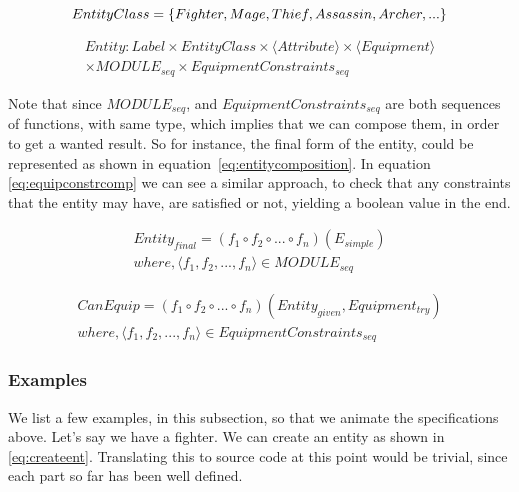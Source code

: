 \begin{equation}
  \label{eq:entityclass}
  EntityClass = \{ Fighter, Mage, Thief, Assassin, Archer, ... \} \\
\end{equation}

\begin{equation}
\begin{split}
  \label{eq:entity}
  Entity\colon Label \times
    EntityClass \times
    \langle Attribute \rangle \times
    \langle Equipment \rangle \\
    \times MODULE_{seq} \times EquipmentConstraints_{seq}
\end{split}
\end{equation}

Note that since $MODULE_{seq}$, and $EquipmentConstraints_{seq}$ are both
sequences of functions, with same type, which implies that we can compose them,
in order to get a wanted result. So for instance, the final form of the entity,
could be represented as shown in equation~\ref{eq:entitycomposition}. In
equation \ref{eq:equipconstrcomp} we can see a similar approach, to check that
any constraints that the entity may have, are satisfied or not, yielding a
boolean value in the end.

\begin{equation}
\begin{split}
  \label{eq:entitycomposition}
  Entity_{final} = (f_1 \circ f_2 \circ ... \circ f_n)(E_{simple}) \\
  where, \langle f_1, f_2, ..., f_n \rangle \in MODULE_{seq}
\end{split}
\end{equation}

\begin{equation}
\begin{split}
  \label{eq:equipconstrcomp}
  CanEquip = (f_1 \circ f_2 \circ ... \circ f_n)(Entity_{given}, Equipment_{try}) \\
  where, \langle f_1, f_2, ..., f_n \rangle \in EquipmentConstraints_{seq}
\end{split}
\end{equation}

\subsubsection{Examples}

We list a few examples, in this subsection, so that we animate the
specifications above. Let's say we have a fighter. We can create an entity as
shown in \ref{eq:createent}. Translating this to source code at this point would
be trivial, since each part so far has been well defined.

